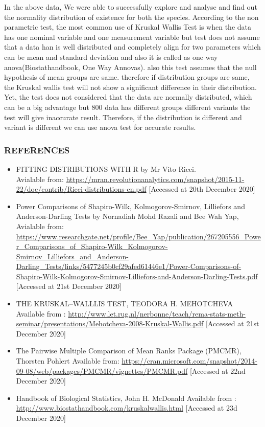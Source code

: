 \documentclass[
]{article}
\begin{document}
In the above data, We were able to successfully explore and analyse and
find out the normality distribution of existence for both the species.
According to the non parametric test, the most common use of Kruskal
Wallis Test is when the data has one nominal variable and one
measurement variable but test does not assume that a data han is well
distributed and completely align for two parameters which can be mean
and standard deviation and also it is called as one way
anova(Biostathandbook, One Way Annovas). also this test assumes that the
null hypothesis of mean groups are same. therefore if distribution
groups are same, the Kruskal wallis test will not show a significant
difference in their distribution. Yet, the test does not considered that
the data are normally distributed, which can be a big advantage but 800
data has different groups different variants the test will give
inaccurate result. Therefore, if the distribution is different and
variant is different we can use anova test for accurate results.

\hypertarget{references}{%
\subsubsection{REFERENCES}\label{references}}

\begin{itemize}
\item
  FITTING DISTRIBUTIONS WITH R by Mr Vito Ricci.\\
  Avialable from:
  \url{https://mran.revolutionanalytics.com/snapshot/2015-11-22/doc/contrib/Ricci-distributions-en.pdf}
  {[}Accessed at 20th December 2020{]}
\item
  Power Comparisons of Shapiro-Wilk, Kolmogorov-Smirnov, Lilliefors and
  Anderson-Darling Tests by Nornadiah Mohd Razali and Bee Wah Yap,
  Avialable from:
  \url{https://www.researchgate.net/profile/Bee_Yap/publication/267205556_Power_Comparisons_of_Shapiro-Wilk_Kolmogorov-Smirnov_Lilliefors_and_Anderson-Darling_Tests/links/5477245b0cf29afed61446e1/Power-Comparisons-of-Shapiro-Wilk-Kolmogorov-Smirnov-Lilliefors-and-Anderson-Darling-Tests.pdf}
  {[}Accessed at 21st December 2020{]}
\item
  THE KRUSKAL--WALLLIS TEST, TEODORA H. MEHOTCHEVA Available from :
  \url{http://www.let.rug.nl/nerbonne/teach/rema-stats-meth-seminar/presentations/Mehotcheva-2008-Kruskal-Wallis.pdf}
  {[}Accessed at 21st December 2020{]}
\item
  The Pairwise Multiple Comparison of Mean Ranks Package (PMCMR),
  Thorsten Pohlert Available from:
  \url{https://cran.microsoft.com/snapshot/2014-09-08/web/packages/PMCMR/vignettes/PMCMR.pdf}
  {[}Accessed at 22nd December 2020{]}
\item
  Handbook of Biological Statistics, John H. McDonald Available from :
  \url{http://www.biostathandbook.com/kruskalwallis.html} {[}Accessed at
  23d December 2020{]}
\end{itemize}
\end{document}
